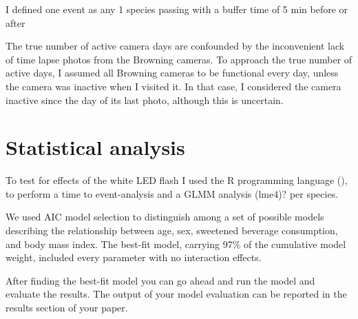 I defined one event as any 1 species passing with a buffer time of 5 min before or after %



The true number of active camera days are confounded by the inconvenient lack of time lapse photos from the Browning cameras. To approach the true number of active days, I assumed all Browning cameras to be functional every day, unless the camera was inactive when I visited it. In that case, I considered the camera inactive since the day of its last photo, although this is uncertain.



\section{Statistical analysis} %
To test for effects of the white LED flash I used the R programming language (\cite{RCoreTeam2020}),%
to perform a time to event-analysis \cite{survival-package} and a GLMM analysis (lme4)? %
per species.







We used AIC model selection to distinguish among a set of possible models describing the relationship between age, sex, sweetened beverage consumption, and body mass index. The best-fit model, carrying 97\%
 of the cumulative model weight, included every parameter with no interaction effects.

After finding the best-fit model you can go ahead and run the model and evaluate the results. The output of your model evaluation can be reported in the results section of your paper.

